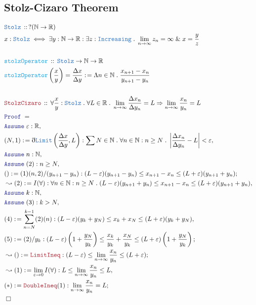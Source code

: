 \documentclass[12pt]{scrartcl}
\newcommand{\TYPE}[1]{\textcolor{NavyBlue}{\mathtt{#1}}}
\newcommand{\FUNC}[1]{\textcolor{Cerulean}{\mathtt{#1}}}
\newcommand{\LOGIC}[1]{\textcolor{Blue}{\mathtt{#1}}}
\newcommand{\THM}[1]{\textcolor{Maroon}{\mathtt{#1}}}
\renewcommand{\.}{\; . \;}
\newcommand{\de}{: \kern 0.1pc =}
\newcommand{\Act}[1]{\left( #1 \right)}
\newcommand{\Theorem}[2]{& \THM{#1} \, :: \, #2 \\ & \Proof = \\ }
\newcommand{\DeclareType}[2]{& \TYPE{#1} \, :: \, #2 \\}
\newcommand{\DefineType}[3]{& #1 : \TYPE{#2} \iff #3 \\}
\newcommand{\DeclareFunc}[2]{& \FUNC{#1} \, :: \, #2 \\}
\newcommand{\DefineNamedFunc}[4]{&  \FUNC{#1}\Act{#2} = #3 \de #4 \\}
\newcommand{\Page}[1]{ \begin{align*} #1 \end{align*}   }
\newcommand{ \bd }{ \ByDef }
\renewcommand{\And}{\; \& \;}
\newcommand{\Reals}{\mathbb{R} }
\newcommand{\Nat}{\mathbb{N} }
\newcommand{\Say}[3]{& #1 \de #2 : #3, \\}
\newcommand{\Conclude}[3]{& #1 \de #2 : #3; \\}
\newcommand{\Derive}[3]{& \leadsto #1 \de #2 : #3, \\}
\newcommand{\DeriveConclude}[3]{& \leadsto #1 \de #2 : #3 ; \\}
\newcommand{\Assume}[2]{& \LOGIC{Assume} \;#1 : #2, \\}
\newcommand{\QED}{\; \square}
\newcommand{\EndProof}{& \QED \\}
\newcommand{\ByDef}{\eth}
\newcommand{\Proof}{\LOGIC{Proof} \; }
\begin{document}
\subsection{Stolz-Cizaro Theorem}
\Page{
	\DeclareType{Stolz}{?(\Nat \to \Reals)}
	\DefineType{x}{Stolz}{\exists y : \Nat \to \Reals : \exists
		z : \TYPE{Increasing} \. \lim_{n \to \infty} z_n = \infty \And x = \frac{y}{z} }
	\\
	\DeclareFunc{stolzOperator}{ \TYPE{Stolz} \to \Nat \to \Reals }
	\DefineNamedFunc{stolzOperator}{\frac{x}{y}}{ \frac{\Delta x}{\Delta y}  }
	{ \Lambda n \in \Nat \. \frac{x_{n+1} - x_n}{y_{n + 1} - y_n}   }
	\\
	\Theorem{StolzCizaro}{\forall  \frac{x}{y} : \TYPE{Stolz} \.  \forall L \in \Reals \.  
	 \lim_{n \to \infty} \frac{\Delta x_n}{\Delta y_n} = L \Rightarrow
	 \lim_{n \to \infty} \frac{x_n}{y_n} = L
	}
	\Assume{\varepsilon}{\Reals}
	\Say{(N,1)}{\bd \TYPE{Limit}\left( \frac{\Delta x}{\Delta y}, L \right)}
	{  \sum N \in \Nat \. \forall n \in  \Nat : n \ge N \.  \left| \frac{\Delta x_n}{\Delta y_n} - L  \right|
		< \varepsilon}
	\Assume{n}{\Nat}
	\Assume{(2)}{n \ge N}
	\Conclude{()}{(1)(n,2)/(y_{n + 1} - y_n)}{   (L - \varepsilon)(y_{n + 1} - y_n) \le  x_{n+1} - x_n \le           
		(L + \varepsilon)(y_{n + 1} + y_n)}
	\Derive{(2)}{I(\forall)}{ \forall n \in \Nat : n \ge N \.    
		(L - \varepsilon)(y_{n + 1} + y_n) \le x_{n + 1} - x_n \le (L + \varepsilon)(y_{n+1} + y_n)
	}
	\Assume{k}{\Nat}
	\Assume{(3)}{ k > N }
	\Say{(4)}{ \sum^{k-1}_{n = N} (2)(n) }{ (L - \varepsilon)(y_k + y_N) \le x_k + x_N \le (L + \varepsilon)(y_k + y_N)}
	\Conclude{(5)}{ (2)/y_k   }{ (L - \varepsilon)\left( 1  + \frac{y_N}{y_k} \right)   
	 \le  \frac{x_k}{y_k} + \frac{x_N}{y_k} \le  (L + \varepsilon)\left( 
	   1   + \frac{y_N}{y_k}
	 \right)
	}
	\DeriveConclude{()}{\THM{LimitIneq}}{  (L - \varepsilon) \le \lim_{n \to \infty} \frac{x_n}{y_n} 
		\le  (L + \varepsilon)   }
	\Derive{(1)}{ \lim_{\varepsilon \to 0}  I(\forall)}{ L \le \lim_{n \to \infty} \frac{x_n}{y_n} \le L  }
	\Conclude{(*)}{\THM{DoubleIneq}(1)}{ \lim_{n \to \infty} \frac{x_n}{y_n} = L  }
	\EndProof
}
\newpage
\end{document}
